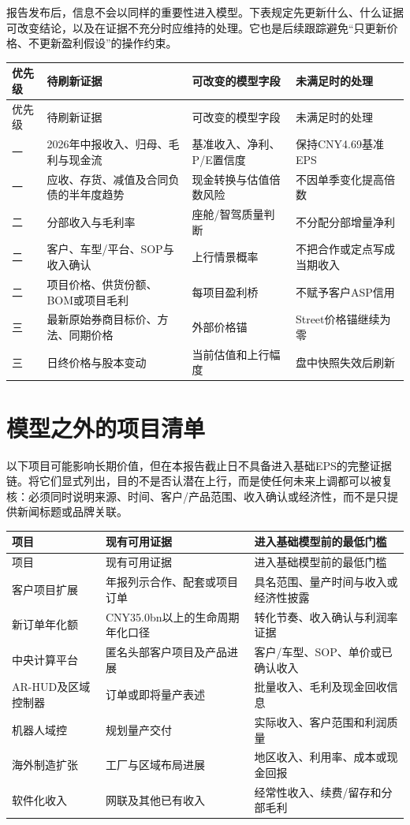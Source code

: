报告发布后，信息不会以同样的重要性进入模型。下表规定先更新什么、什么证据可改变结论，以及在证据不充分时应维持的处理。它也是后续跟踪避免“只更新价格、不更新盈利假设”的操作约束。

\renewcommand{\arraystretch}{1.15}
\begin{longtable}{L{2.5cm}L{2.7cm}L{3.0cm}L{2.4cm}}
\toprule
优先级 & 待刷新证据 & 可改变的模型字段 & 未满足时的处理 \\
\midrule
\endfirsthead
\toprule
优先级 & 待刷新证据 & 可改变的模型字段 & 未满足时的处理 \\
\midrule
\endhead
一 & 2026年中报收入、归母、毛利与现金流 & 基准收入、净利、P/E置信度 & 保持CNY4.69基准EPS \\
一 & 应收、存货、减值及合同负债的半年度趋势 & 现金转换与估值倍数风险 & 不因单季变化提高倍数 \\
二 & 分部收入与毛利率 & 座舱/智驾质量判断 & 不分配分部增量净利 \\
二 & 客户、车型/平台、SOP与收入确认 & 上行情景概率 & 不把合作或定点写成当期收入 \\
二 & 项目价格、供货份额、BOM或项目毛利 & 每项目盈利桥 & 不赋予客户ASP信用 \\
三 & 最新原始券商目标价、方法、同期价格 & 外部价格锚 & Street价格锚继续为零 \\
三 & 日终价格与股本变动 & 当前估值和上行幅度 & 盘中快照失效后刷新 \\
\bottomrule
\end{longtable}

\section{模型之外的项目清单}

以下项目可能影响长期价值，但在本报告截止日不具备进入基础EPS的完整证据链。将它们显式列出，目的不是否认潜在上行，而是使任何未来上调都可以被复核：必须同时说明来源、时间、客户/产品范围、收入确认或经济性，而不是只提供新闻标题或品牌关联。

\renewcommand{\arraystretch}{1.12}
\begin{longtable}{L{3.1cm}L{3.2cm}L{4.3cm}}
\toprule
项目 & 现有可用证据 & 进入基础模型前的最低门槛 \\
\midrule
\endfirsthead
\toprule
项目 & 现有可用证据 & 进入基础模型前的最低门槛 \\
\midrule
\endhead
客户项目扩展 & 年报列示合作、配套或项目订单 & 具名范围、量产时间与收入或经济性披露 \\
新订单年化额 & CNY35.0bn以上的生命周期年化口径 & 转化节奏、收入确认与利润率证据 \\
中央计算平台 & 匿名头部客户项目及产品进展 & 客户/车型、SOP、单价或已确认收入 \\
AR-HUD及区域控制器 & 订单或即将量产表述 & 批量收入、毛利及现金回收信息 \\
机器人域控 & 规划量产交付 & 实际收入、客户范围和利润质量 \\
海外制造扩张 & 工厂与区域布局进展 & 地区收入、利用率、成本或现金回报 \\
软件化收入 & 网联及其他已有收入 & 经常性收入、续费/留存和分部毛利 \\
\bottomrule
\end{longtable}
